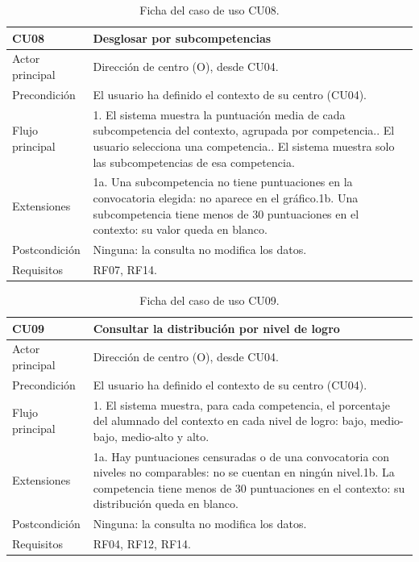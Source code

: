 \documentclass[12pt, a4paper, oneside]{report}
\begin{document}
\begin{table}[!tbp]
\centering
\small
{}\renewcommand{\arraystretch}{1.1}
\begin{tabularx}{\textwidth}{@{} >{\raggedright\arraybackslash}p{2.8cm} X @{}}
\toprule
\textbf{CU08} & \textbf{Desglosar por subcompetencias} \\ \midrule
Actor principal & Dirección de centro (O), desde CU04. \\ \addlinespace
Precondición & El usuario ha definido el contexto de su centro (CU04). \\ \addlinespace
Flujo principal & 1. El sistema muestra la puntuación media de cada subcompetencia del contexto, agrupada por competencia.\newline 2. El usuario selecciona una competencia.\newline 3. El sistema muestra solo las subcompetencias de esa competencia. \\ \addlinespace
Extensiones & 1a. Una subcompetencia no tiene puntuaciones en la convocatoria elegida: no aparece en el gráfico.\newline 1b. Una subcompetencia tiene menos de 30 puntuaciones en el contexto: su valor queda en blanco. \\ \addlinespace
Postcondición & Ninguna: la consulta no modifica los datos. \\ \addlinespace
Requisitos & RF07, RF14. \\ \bottomrule
\end{tabularx}
\caption{Ficha del caso de uso CU08.}
\label{tab:cu08}
\end{table}

\begin{table}[!tbp]
\centering
\small
{}\renewcommand{\arraystretch}{1.1}
\begin{tabularx}{\textwidth}{@{} >{\raggedright\arraybackslash}p{2.8cm} X @{}}
\toprule
\textbf{CU09} & \textbf{Consultar la distribución por nivel de logro} \\ \midrule
Actor principal & Dirección de centro (O), desde CU04. \\ \addlinespace
Precondición & El usuario ha definido el contexto de su centro (CU04). \\ \addlinespace
Flujo principal & 1. El sistema muestra, para cada competencia, el porcentaje del alumnado del contexto en cada nivel de logro: bajo, medio-bajo, medio-alto y alto. \\ \addlinespace
Extensiones & 1a. Hay puntuaciones censuradas o de una convocatoria con niveles no comparables: no se cuentan en ningún nivel.\newline 1b. La competencia tiene menos de 30 puntuaciones en el contexto: su distribución queda en blanco. \\ \addlinespace
Postcondición & Ninguna: la consulta no modifica los datos. \\ \addlinespace
Requisitos & RF04, RF12, RF14. \\ \bottomrule
\end{tabularx}
\caption{Ficha del caso de uso CU09.}
\label{tab:cu09}
\end{table}
\end{document}
